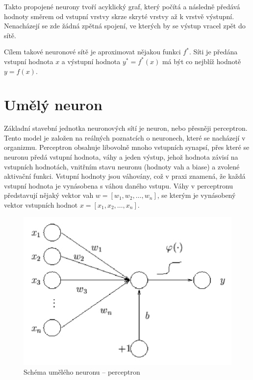 Takto propojené neurony tvoří acyklický graf, který počítá a následně předává hodnoty směrem od vstupní vrstvy skrze skryté vrstvy až k vrstvě výstupní. Nenacházejí se zde žádná zpětná spojení, ve kterých by se výstup vracel zpět do sítě.\cite{mitdeeplearning}

Cílem takové neuronové sítě je aproximovat nějakou funkci $f^\ast$. Síti je předána vstupní hodnota $x$ a výstupní hodnota $y^\ast = f^\ast(x)$ má být co nejblíž hodnotě $y = f(x)$.


\section{Umělý neuron}
Základní stavební jednotka neuronových sítí je neuron, nebo přesněji perceptron. Tento model je založen na reálných poznatcích o neuronech, které se nacházejí v organizmu. Perceptron obsahuje libovolně mnoho vstupních synapsí, přes které se neuronu předá vstupní hodnota, váhy a jeden výstup, jehož hodnota závisí na vstupních hodnotách, vnitřním stavu neuronu (hodnoty vah a biase) a zvolené aktivační funkci. Vstupní hodnoty jsou váhovány, což v praxi znamená, že každá vstupní hodnota je vynásobena s váhou daného vstupu. Váhy v perceptronu představují nějaký vektor vah $w = [w_1, w_2, \dots, w_n]$, se kterým je vynásobený vektor vstupních hodnot $x = [x_1, x_2, \dots, x_n]$.

\begin{figure}[H]
    \centering
    \includegraphics[scale=0.5]{obrazky-figures/perceptron.png}
    \caption{\label{fig:neuron}Schéma umělého neuronu -- perceptron}
\end{figure}

